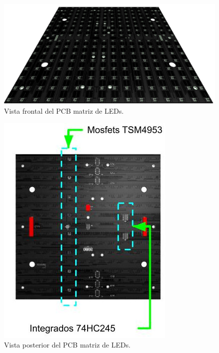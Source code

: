 \begin{figure}[htpb]
	\centering
	\includegraphics[scale=0.3]{Figures/pcbfullcolorfrontrender.jpg} 
	\caption{Vista frontal del PCB matriz de LEDs.}
	\label{fig:pcbrenderfront}
\end{figure}
\begin{figure}[htpb]
	\centering
	\includegraphics[scale=4]{Figures/pcbfullcolorbackrender.jpg} 
	\caption{Vista posterior del PCB matriz de LEDs.}
	\label{fig:pcbrenderback}
\end{figure}


